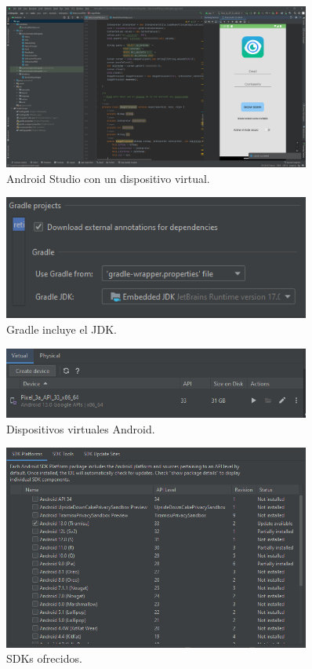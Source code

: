 \begin{figure}[!ht]
         \centering
         \includegraphics[width=0.9\textwidth]{img/Android Studio.png}
         \caption{Android Studio con un dispositivo virtual.}
         \label{fig:Android Studio}
\end{figure}
\begin{figure}[!ht]
         \centering
         \includegraphics[width=0.9\textwidth]{img/JDK Graddle.png}
         \caption{Gradle incluye el JDK.}
         \label{fig:JDK}
\end{figure}
\begin{figure}[!ht]
         \centering
         \includegraphics[width=0.9\textwidth]{img/AVD.png}
         \caption{Dispositivos virtuales Android.}
         \label{fig:AVD}
\end{figure}

\begin{figure}[!ht]
         \centering
         \includegraphics[width=0.9\textwidth]{img/SDK Android.png}
         \caption{SDKs ofrecidos.}
         \label{fig:SDK}
\end{figure}

